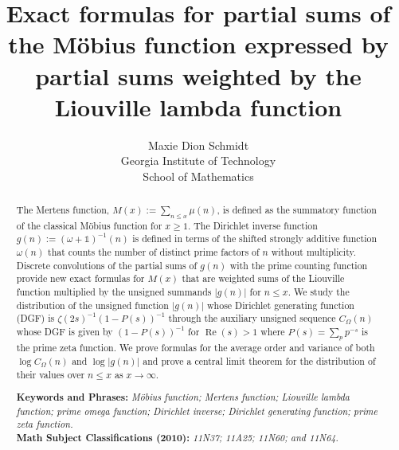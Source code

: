 \documentclass[11pt,reqno,a4letter]{article}
\title{
       Exact formulas for partial sums of the M\"obius function expressed by 
       partial sums weighted by the Liouville lambda function
}
\author{Maxie Dion Schmidt \\
        Georgia Institute of Technology \\
        School of Mathematics
}
\numberwithin{equation}{section}
\numberwithin{figure}{section}
\numberwithin{table}{section}
\theoremstyle{plain}
\numberwithin{theorem}{section}
\theoremstyle{definition}
\renewcommand{\Re}{\operatorname{Re}}
\begin{document}
 

\maketitle

\begin{abstract} 
\noindent  
The Mertens function, $M(x) := \sum_{n \leq x} \mu(n)$, is 
defined as the summatory function of the classical M\"obius function for $x \geq 1$.
The Dirichlet inverse function $g(n) := (\omega+\mathds{1})^{-1}(n)$
is defined in terms of the shifted strongly additive function $\omega(n)$ that counts the 
number of distinct prime factors of $n$ without multiplicity. 
Discrete convolutions of the partial sums of $g(n)$ with the prime counting function 
provide new exact formulas for $M(x)$ that are weighted sums of the Liouville function 
multiplied by the unsigned summands $|g(n)|$ for $n \leq x$. 
We study the distribution of the unsigned function $|g(n)|$ whose 
Dirichlet generating function (DGF) is $\zeta(2s)^{-1}(1-P(s))^{-1}$ 
through the auxiliary unsigned sequence $C_{\Omega}(n)$ whose DGF is given by 
$(1-P(s))^{-1}$ for $\Re(s) > 1$ where $P(s) = \sum_p p^{-s}$ is the 
prime zeta function. 
We prove formulas for the average order and variance of both 
$\log C_{\Omega}(n)$ and $\log |g(n)|$ and prove a central limit theorem 
for the distribution of their values over $n \leq x$ as $x \rightarrow \infty$. 

\bigskip\noindent
\textbf{Keywords and Phrases:} {\it M\"obius function; Mertens function; 
                                    Liouville lambda function; prime omega function; 
                                    Dirichlet inverse; Dirichlet generating function; 
				    prime zeta function. } \\[0.05cm] 
\textbf{Math Subject Classifications (2010):} {\it 11N37; 11A25; 11N60; and 11N64. } 
\end{abstract} 
\end{document}
